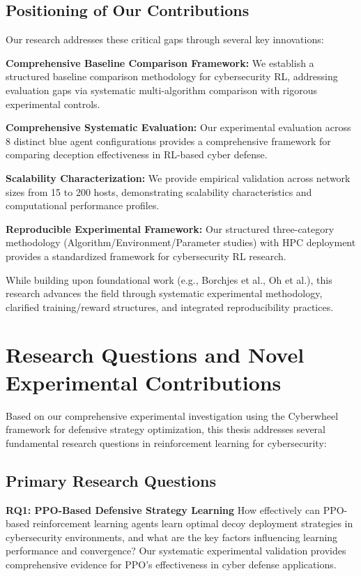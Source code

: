 \documentclass[12pt]{article}
\theoremstyle{definition}
\theoremstyle{plain}
\begin{document}
\subsection{Positioning of Our Contributions}

Our research addresses these critical gaps through several key innovations:

\textbf{Comprehensive Baseline Comparison Framework:} We establish a structured baseline comparison methodology for cybersecurity RL, addressing evaluation gaps via systematic multi-algorithm comparison with rigorous experimental controls.

\textbf{Comprehensive Systematic Evaluation:} Our experimental evaluation across 8 distinct blue agent configurations provides a comprehensive framework for comparing deception effectiveness in RL-based cyber defense.

\textbf{Scalability Characterization:} We provide empirical validation across network sizes from 15 to 200 hosts, demonstrating scalability characteristics and computational performance profiles.

\textbf{Reproducible Experimental Framework:} Our structured three-category methodology (Algorithm/Environment/Parameter studies) with HPC deployment provides a standardized framework for cybersecurity RL research.

While building upon foundational work (e.g., Borchjes et al., Oh et al.), this research advances the field through systematic experimental methodology, clarified training/reward structures, and integrated reproducibility practices.

\section{Research Questions and Novel Experimental Contributions}

Based on our comprehensive experimental investigation using the Cyberwheel framework for defensive strategy optimization, this thesis addresses several fundamental research questions in reinforcement learning for cybersecurity:

\subsection{Primary Research Questions}

\textbf{RQ1: PPO-Based Defensive Strategy Learning} 
How effectively can PPO-based reinforcement learning agents learn optimal decoy deployment strategies in cybersecurity environments, and what are the key factors influencing learning performance and convergence? Our systematic experimental validation provides comprehensive evidence for PPO's effectiveness in cyber defense applications.
\end{document}

